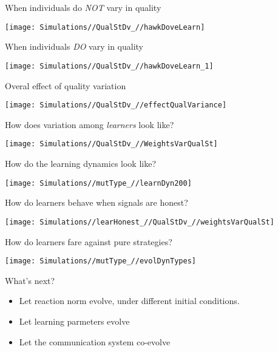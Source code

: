 \documentclass[ignorenonframetext,]{beamer}
\providecommand{\tightlist}{%
  \setlength{\itemsep}{0pt}\setlength{\parskip}{0pt}}
\begin{document}
\begin{frame}{When individuals do \emph{NOT} vary in quality}

\begin{center}\texttt{[image: Simulations//QualStDv\_//hawkDoveLearn]} \end{center}

\end{frame}

\begin{frame}{When individuals \emph{DO} vary in quality}

\begin{center}\texttt{[image: Simulations//QualStDv\_//hawkDoveLearn\_1]} \end{center}

\end{frame}

\begin{frame}{Overal effect of quality variation}

\begin{center}\texttt{[image: Simulations//QualStDv\_//effectQualVariance]} \end{center}

\end{frame}

\begin{frame}{How does variation among \emph{learners} look like?}

\begin{center}\texttt{[image: Simulations//QualStDv\_//WeightsVarQualSt]} \end{center}

\end{frame}

\begin{frame}{How do the learning dynamics look like?}

\texttt{[image: Simulations//mutType\_//learnDyn200]}

\end{frame}

\begin{frame}{How do learners behave when signals are honest?}

\texttt{[image: Simulations//learHonest\_//QualStDv\_//weightsVarQualSt]}

\end{frame}

\begin{frame}{How do learners fare against pure strategies?}

\begin{center}\texttt{[image: Simulations//mutType\_//evolDynTypes]} \end{center}

\end{frame}

\begin{frame}{What's next?}

\begin{itemize}
\tightlist
\item
  Let reaction norm evolve, under different initial conditions.
\item
  Let learning parmeters evolve
\item
  Let the communication system co-evolve
\end{itemize}

\end{frame}
\end{document}
